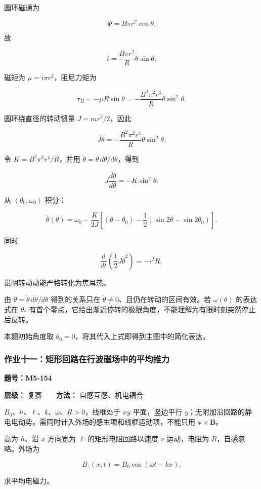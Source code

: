 圆环磁通为

\[
\Phi=B\pi r^2\cos\theta.
\]

故

\[
i=\frac{B\pi r^2}{R}\dot\theta\sin\theta.
\]

磁矩为 \(\mu=i\pi r^2\)，阻尼力矩为

\[
\tau_B=-\mu B\sin\theta
=-\frac{B^2\pi^2r^4}{R}\dot\theta\sin^2\theta.
\]

圆环绕直径的转动惯量 \(J=mr^2/2\)，因此

\[
\boxed{
J\ddot\theta
=-\frac{B^2\pi^2r^4}{R}\dot\theta\sin^2\theta}.
\]

令 \(K=B^2\pi^2r^4/R\)，并用
\(\ddot\theta=\dot\theta\,d\dot\theta/d\theta\)，得到

\[
J\frac{d\dot\theta}{d\theta}=-K\sin^2\theta.
\]

从 \((\theta_0,\omega_0)\) 积分：

\[
\boxed{
\dot\theta(\theta)=\omega_0
-\frac{K}{2J}
\left[(\theta-\theta_0)-\frac12(\sin2\theta-\sin2\theta_0)\right]}.
\]

同时

\[
\frac d{dt}\left(\frac12J\dot\theta^2\right)=-i^2R,
\]

说明转动动能严格转化为焦耳热。

由 \(\ddot\theta=\dot\theta\,d\dot\theta/d\theta\) 得到的关系只在
\(\dot\theta\ne0\)、且仍在转动的区间有效。若 \(\omega(\theta)\)
的表达式在 \(\theta_*\)
有首个零点，它给出渐近停转的极限角度，不能理解为有限时刻突然停止后反转。

本题初始角度取 \(\theta_0=0\)，将其代入上式即得到主图中的简化表达。

\par{}
\noindent\begin{minipage}{\linewidth}

\subsubsection{作业十一：矩形回路在行波磁场中的平均推力}\label{m5:ux4f5cux4e1aux5341ux4e00ux77e9ux5f62ux56deux8defux5728ux884cux6ce2ux78c1ux573aux4e2dux7684ux5e73ux5747ux63a8ux529b}

\textbf{题号：M5-154}

\textbf{层级：} 复赛　　\textbf{方法：} 自感互感、机电耦合

\(B_0\text{、}h\text{、}\ell\text{、}k\text{、}\omega\text{、}R>0\)，线框处于
\(xy\) 平面，竖边平行
\(y\)；无附加沿回路的静电电动势。需同时计入外场的感生项和线框运动项，不能只用
\(\mathbf v\times\mathbf B\)。

高为 \(h\)、沿 \(x\) 方向宽为 \(\ell\) 的矩形电阻回路以速度 \(v\)
运动，电阻为 \(R\)，自感忽略。外场为

\[
B_z(x,t)=B_0\cos(\omega t-kx).
\]

求平均电磁力。

\end{minipage}\par

